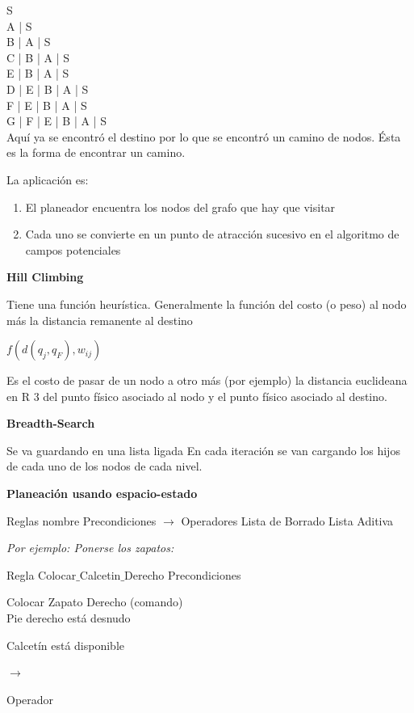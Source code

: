 S \\
A | S \\
B | A | S \\
C | B | A | S \\
E | B | A | S \\
D | E | B | A | S \\
F | E | B | A | S \\
G | F | E | B | A | S \\ 

Aquí ya se encontró el destino por lo que se encontró un camino de nodos. Ésta es la forma de encontrar un
camino.

La aplicación es:

\begin{enumerate}[1.]
	\item El planeador encuentra los nodos del grafo que hay que visitar	
	\item Cada uno se convierte en un punto de atracción sucesivo en el algoritmo de campos potenciales	
\end{enumerate}



\textbf{Hill Climbing}

Tiene una función heurística.
Generalmente la función del costo (o peso) al nodo más la distancia remanente al destino

$f(d(q_j, q_F), w_{ij})$

Es el costo de pasar de un nodo a otro más (por ejemplo) la distancia euclideana en R 3 del punto físico
asociado al nodo y el punto físico asociado al destino.

\textbf{Breadth-Search}

Se va guardando en una lista ligada
En cada iteración se van cargando los hijos de cada uno de los nodos de cada nivel.

\textbf{Planeación usando espacio-estado}

Reglas nombre {
	Precondiciones
	$\rightarrow$
	Operadores
	Lista de Borrado
	Lista Aditiva
}


\textit{Por ejemplo: Ponerse los zapatos:}


Regla Colocar$\_$Calcetin$\_$Derecho
Precondiciones

Colocar Zapato Derecho (comando) \\

Pie derecho está desnudo

Calcetín está disponible

$\rightarrow$

Operador

